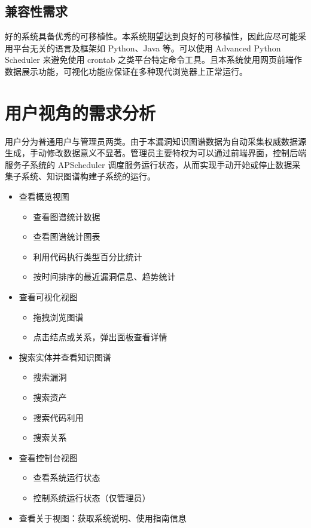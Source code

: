 \documentclass[a4paper,AutoFakeBold,oneside,12pt]{book}
\begin{document}
\subsection{兼容性需求}

好的系统具备优秀的可移植性。本系统期望达到良好的可移植性，因此应尽可能采用平台无关的语言及框架如 Python、Java 等。可以使用 Advanced Python Scheduler 来避免使用 crontab 之类平台特定命令工具。且本系统使用网页前端作数据展示功能，可视化功能应保证在多种现代浏览器上正常运行。

\section{用户视角的需求分析}

用户分为普通用户与管理员两类。由于本漏洞知识图谱数据为自动采集权威数据源生成，手动修改数据意义不显著。管理员主要特权为可以通过前端界面，控制后端服务子系统的 APScheduler 调度服务运行状态，从而实现手动开始或停止数据采集子系统、知识图谱构建子系统的运行。

\begin{itemize}
	\item 查看概览视图
	      \begin{itemize}
		      \item 查看图谱统计数据
		      \item 查看图谱统计图表
		      \item 利用代码执行类型百分比统计
		      \item 按时间排序的最近漏洞信息、趋势统计
	      \end{itemize}
	\item 查看可视化视图
	      \begin{itemize}
		      \item 拖拽浏览图谱
		      \item 点击结点或关系，弹出面板查看详情
	      \end{itemize}
	\item 搜索实体并查看知识图谱
	      \begin{itemize}
		      \item 搜索漏洞
		      \item 搜索资产
		      \item 搜索代码利用
		      \item 搜索关系
	      \end{itemize}
	\item 查看控制台视图
	      \begin{itemize}
		      \item 查看系统运行状态
		      \item 控制系统运行状态（仅管理员）
	      \end{itemize}
	\item 查看关于视图：获取系统说明、使用指南信息
\end{itemize}
\end{document}
